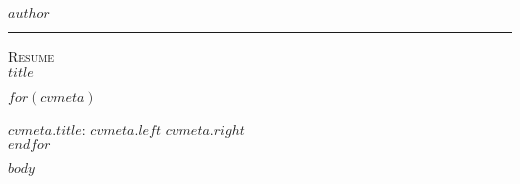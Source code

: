 \documentclass[10pt,A4]{article}
\newcommand{\metasection}[2]
{
\footnotesize{#2} \hspace*{\fill} \footnotesize{#1}\\[1pt]
}
\newcommand{\mystrut}{\rule[-.3\baselineskip]{0pt}{\baselineskip}}
\begin{document}
\pagestyle{fancy}

\vspace{-8pt}
\begin{center}
	\HUGE \textsc{$author$} \textcolor{sectcol}{\rule[-1mm]{1mm}{0.9cm}} \textsc{Resume}\\[2pt]
	\small $title$
\end{center}

\vspace{6pt}

$for(cvmeta)$
\metasection{$cvmeta.right$}{\textbf{$cvmeta.title$}: $cvmeta.left$}
$endfor$

\vspace{-2pt}
\vspace{6pt}

\normalsize

\vspace{-6pt}
$body$


\null
\vspace*{\fill}
\hspace{-0.25\linewidth}\colorbox{white}{\makebox[1.5\linewidth][c]{\mystrut  \textnormal{\textcolor{sectcol}{$cvfooter.left$}  \textbullet  \textcolor{sectcol}{$cvfooter.right$}}}}
\end{document}
